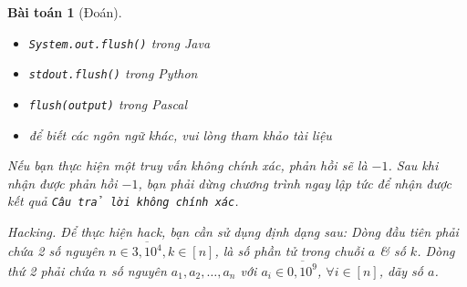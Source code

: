 \documentclass{article}
\newtheorem{baitoan}{Bài toán}
\begin{document}
\begin{baitoan}[Đoán]
\begin{itemize}
        \item {\tt System.out.flush()} trong Java
        \item {\tt stdout.flush()} trong Python
        \item {\tt flush(output)} trong Pascal
        \item để biết các ngôn ngữ khác, vui lòng tham khảo tài liệu
    \end{itemize}
    Nếu bạn thực hiện một truy vấn không chính xác, phản hồi sẽ là $-1$. Sau khi nhận được phản hồi $-1$, bạn phải dừng chương trình ngay lập tức để nhận được kết quả {\tt Câu trả lời không chính xác}.
    \item {\sf Hacking.} Để thực hiện hack, bạn cần sử dụng định dạng sau: Dòng đầu tiên phải chứa 2 số nguyên $n\in\overline{3,10^4},k\in[n]$, là số phần tử trong chuỗi $a$ \& số $k$. Dòng thứ 2 phải chứa $n$ số nguyên $a_1,a_2,\ldots,a_n$ với $a_i\in\overline{0,10^9}$, $\forall i\in[n]$, dãy số $a$.
\end{baitoan}
\end{document}
